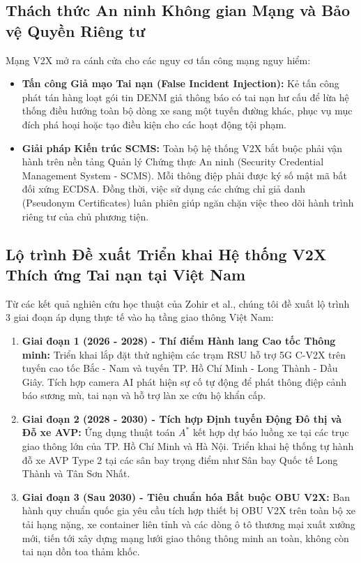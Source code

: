 \documentclass[a4paper]{article}
\begin{document}
\subsection{Thách thức An ninh Không gian Mạng và Bảo vệ Quyền Riêng tư}
Mạng V2X mở ra cánh cửa cho các nguy cơ tấn công mạng nguy hiểm:
\begin{itemize}
    \item \textbf{Tấn công Giả mạo Tai nạn (False Incident Injection):} Kẻ tấn công phát tán hàng loạt gói tin DENM giả thông báo có tai nạn hư cấu để lừa hệ thống điều hướng toàn bộ dòng xe sang một tuyến đường khác, phục vụ mục đích phá hoại hoặc tạo điều kiện cho các hoạt động tội phạm.
    \item \textbf{Giải pháp Kiến trúc SCMS:} Toàn bộ hệ thống V2X bắt buộc phải vận hành trên nền tảng Quản lý Chứng thực An ninh (Security Credential Management System - SCMS). Mỗi thông điệp phải được ký số mật mã bất đối xứng ECDSA. Đồng thời, việc sử dụng các chứng chỉ giả danh (Pseudonym Certificates) luân phiên giúp ngăn chặn việc theo dõi hành trình riêng tư của chủ phương tiện.
\end{itemize}

\subsection{Lộ trình Đề xuất Triển khai Hệ thống V2X Thích ứng Tai nạn tại Việt Nam}
Từ các kết quả nghiên cứu học thuật của Zohir et al., chúng tôi đề xuất lộ trình 3 giai đoạn áp dụng thực tế vào hạ tầng giao thông Việt Nam:
\begin{enumerate}
    \item \textbf{Giai đoạn 1 (2026 - 2028) - Thí điểm Hành lang Cao tốc Thông minh:}
    Triển khai lắp đặt thử nghiệm các trạm RSU hỗ trợ 5G C-V2X trên tuyến cao tốc Bắc - Nam và tuyến TP. Hồ Chí Minh - Long Thành - Dầu Giây. Tích hợp camera AI phát hiện sự cố tự động để phát thông điệp cảnh báo sương mù, tai nạn và hỗ trợ làn xe cứu hộ khẩn cấp.
    \item \textbf{Giai đoạn 2 (2028 - 2030) - Tích hợp Định tuyến Động Đô thị và Đỗ xe AVP:}
    Ứng dụng thuật toán $A^*$ kết hợp dự báo luồng xe tại các trục giao thông lớn của TP. Hồ Chí Minh và Hà Nội. Triển khai hệ thống tự hành đỗ xe AVP Type 2 tại các sân bay trọng điểm như Sân bay Quốc tế Long Thành và Tân Sơn Nhất.
    \item \textbf{Giai đoạn 3 (Sau 2030) - Tiêu chuẩn hóa Bắt buộc OBU V2X:}
    Ban hành quy chuẩn quốc gia yêu cầu tích hợp thiết bị OBU V2X trên toàn bộ xe tải hạng nặng, xe container liên tỉnh và các dòng ô tô thương mại xuất xưởng mới, tiến tới xây dựng mạng lưới giao thông thông minh an toàn, không còn tai nạn dồn toa thảm khốc.
\end{enumerate}
\end{document}
